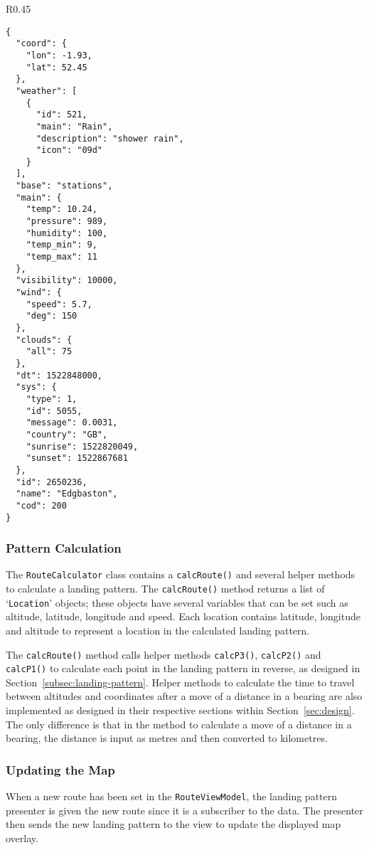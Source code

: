\begin{wrapfigure}[41]{R}{0.45\textwidth}
  \begin{verbatim}
{
  "coord": {
    "lon": -1.93,
    "lat": 52.45
  },
  "weather": [
    {
      "id": 521,
      "main": "Rain",
      "description": "shower rain",
      "icon": "09d"
    }
  ],
  "base": "stations",
  "main": {
    "temp": 10.24,
    "pressure": 989,
    "humidity": 100,
    "temp_min": 9,
    "temp_max": 11
  },
  "visibility": 10000,
  "wind": {
    "speed": 5.7,
    "deg": 150
  },
  "clouds": {
    "all": 75
  },
  "dt": 1522848000,
  "sys": {
    "type": 1,
    "id": 5055,
    "message": 0.0031,
    "country": "GB",
    "sunrise": 1522820049,
    "sunset": 1522867681
  },
  "id": 2650236,
  "name": "Edgbaston",
  "cod": 200
}
  \end{verbatim}
  \label{lst:json-response}
\end{wrapfigure}

\subsubsection{Pattern Calculation}\label{subsubsec:pattern-calculation}
The \texttt{RouteCalculator} class contains a \texttt{calcRoute()} and several helper methods to calculate a landing pattern. The \texttt{calcRoute()} method returns a list of `\texttt{Location}' objects; these objects have several variables that can be set such as altitude, latitude, longitude and speed. Each location contains latitude, longitude and altitude to represent a location in the calculated landing pattern.

The \texttt{calcRoute()} method calls helper methods \texttt{calcP3()}, \texttt{calcP2()} and \texttt{calcP1()} to calculate each point in the landing pattern in reverse, as designed in Section~\ref{subsec:landing-pattern}. Helper methods to calculate the time to travel between altitudes and coordinates after a move of a distance in a bearing are also implemented as designed in their respective sections within Section~\ref{sec:design}. The only difference is that in the method to calculate a move of a distance in a bearing, the distance is input as metres and then converted to kilometres.

\subsubsection{Updating the Map}
When a new route has been set in the \texttt{RouteViewModel}, the landing pattern presenter is given the new route since it is a subscriber to the data. The presenter then sends the new landing pattern to the view to update the displayed map overlay.

